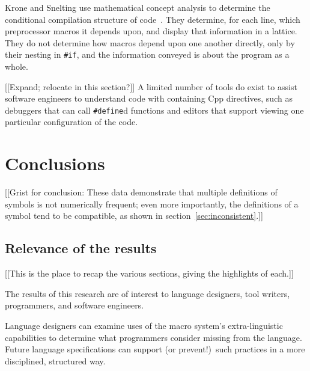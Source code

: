 \documentclass[10pt]{article}
\begin{document}
Krone and Snelting use mathematical concept analysis to determine the
conditional compilation structure of code~\cite{Krone94}.  They determine,
for each line, which preprocessor macros it depends upon, and display that
information in a lattice.  They do not determine how macros depend upon one
another directly, only by their nesting in {\tt \#if}, and the information
conveyed is about the program as a whole.


[[Expand; relocate in this section?]]
A limited number of tools do exist to assist software engineers to
understand code with containing Cpp directives, such as debuggers that can
call {\tt \#define}d functions and editors that support viewing one
particular configuration of the code.




\section{Conclusions}
\label{sec:conclusion}

[[Grist for conclusion: These data demonstrate that multiple definitions of
symbols is not numerically frequent; even more importantly, the definitions
of a symbol tend to be compatible, as shown in
section~\ref{sec:inconsistent}.]]


\subsection{Relevance of the results}

[[This is the place to recap the various sections, giving the highlights of
each.]]

The results of this research are of interest to language designers, tool
writers, programmers, and software engineers.

Language designers can examine uses of the macro system's extra-linguistic
capabilities to determine what programmers consider missing from the
language.  Future language specifications can support (or prevent!)\ such
practices in a more disciplined, structured way.

\end{document}
